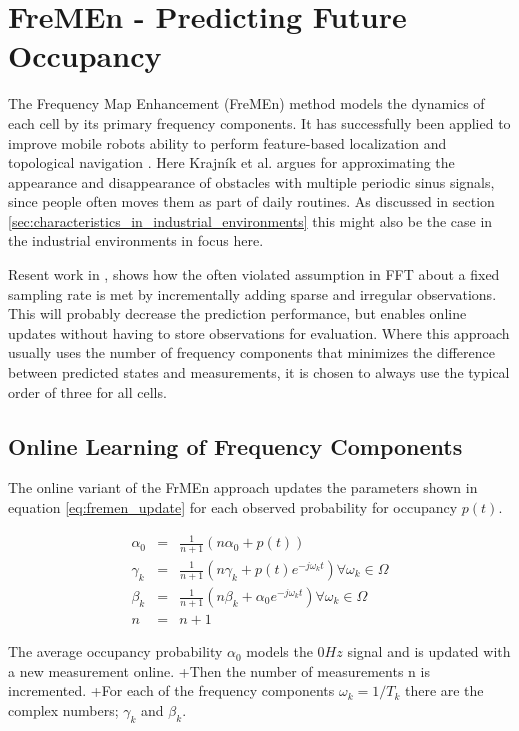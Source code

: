 \section{FreMEn - Predicting Future Occupancy}
\label{sec:fremen}
The  Frequency Map Enhancement (FreMEn) method models the dynamics of each cell by its primary frequency components. 
It has successfully been applied to improve mobile robots ability to perform feature-based localization \cite{online_fremen} and topological navigation \cite{fentanes2015}. 
Here Krajník et al. argues for approximating the appearance and disappearance of obstacles with multiple periodic sinus signals, since people often moves them as part of daily routines. 
As discussed in section \ref{sec:characteristics_in_industrial_environments} this might also be the case in the industrial environments in focus here. 

Resent work in \cite{life_long_exploration}, shows how the often violated assumption in FFT about a fixed sampling rate is met by incrementally adding sparse and irregular observations. 
This will probably decrease the prediction performance, but enables online updates without having to store observations for evaluation. 
Where this approach usually uses the number of frequency components that minimizes the difference between predicted states and measurements, it is chosen to always use the typical order of three \cite{life_long_exploration} for all cells.

\subsection{Online Learning of Frequency Components}
The online variant of the FrMEn approach updates the parameters shown in equation \ref{eq:fremen_update} for each  observed probability for occupancy $p(t)$. 

\begin{eqnarray}
\alpha_0 &=& \frac{1}{n+1}(n \alpha_0 + p(t)) \nonumber \\ 
\gamma_k &=& \frac{1}{n+1}(n \gamma_k + p(t) e^{-j \omega_k t}) \forall \omega_k \in \Omega  \\
\beta_k &=& \frac{1}{n+1}(n \beta_k + \alpha_0 e^{-j \omega_k t}) \forall \omega_k \in \Omega \nonumber \\
n &=& n + 1 \nonumber
\label{eq:fremen_update}
\end{eqnarray}

The average occupancy probability $\alpha_0$ models the $0Hz$ signal and is updated with a new measurement online.
+Then the number of measurements n is incremented.
+For each of the frequency components $\omega_k=1/T_k$ there are the complex numbers; $\gamma_k$ and $\beta_k$. 

